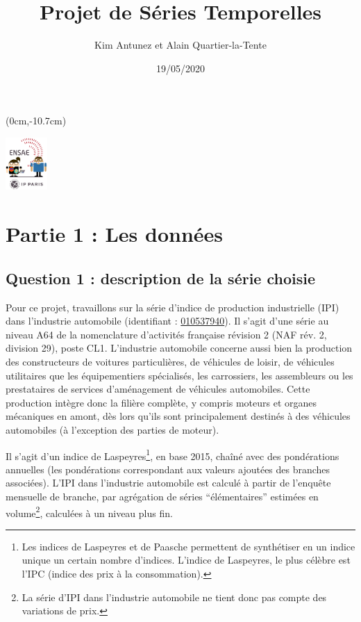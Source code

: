 \documentclass[french]{article}
\title{Projet de Séries Temporelles}
\author{Kim Antunez et Alain Quartier-la-Tente}
\date{19/05/2020}
\let\rmarkdownfootnote\footnote%
\def\footnote{\protect\rmarkdownfootnote}
\begin{document}
\maketitle

{
\hypersetup{linkcolor=}
\setcounter{tocdepth}{3}
\tableofcontents
}
\begin{textblock*}{\textwidth}(0cm,-10.7cm)
\begin{center}
\includegraphics[height=2cm]{img/LOGO-ENSAE-avatar.png}
\end{center}
\end{textblock*}

\thispagestyle{empty}
\newpage\setcounter{page}{1}

\hypertarget{partie-1-les-donnuxe9es}{%
\section{Partie 1 : Les données}\label{partie-1-les-donnuxe9es}}

\hypertarget{question-1-description-de-la-suxe9rie-choisie}{%
\subsection{Question 1 : description de la série choisie}\label{question-1-description-de-la-suxe9rie-choisie}}

Pour ce projet, travaillons sur la série d'indice de production industrielle (IPI) dans l'industrie automobile (identifiant : \href{https://bdm.insee.fr/series/sdmx/data/SERIES_BDM/010537940}{010537940}).
Il s'agit d'une série au niveau A64 de la nomenclature d'activités française révision 2 (NAF rév. 2, division 29), poste CL1.
L'industrie automobile concerne aussi bien la production des constructeurs de voitures particulières, de véhicules de loisir, de véhicules utilitaires que les équipementiers spécialisés, les carrossiers, les assembleurs ou les prestataires de services d'aménagement de véhicules automobiles.
Cette production intègre donc la filière complète, y compris moteurs et organes mécaniques en amont, dès lors qu'ils sont principalement destinés à des véhicules automobiles (à l'exception des parties de moteur).

Il s'agit d'un indice de Laspeyres\footnote{Les indices de Laspeyres et de Paasche permettent de synthétiser en un indice unique un certain nombre d'indices. L'indice de Laspeyres, le plus célèbre est l'IPC (indice des prix à la consommation).}, en base 2015, chaîné avec des pondérations annuelles (les pondérations correspondant aux valeurs ajoutées des branches associées).
L'IPI dans l'industrie automobile est calculé à partir de l'enquête mensuelle de branche, par agrégation de séries ``élémentaires'' estimées en volume\footnote{La série d'IPI dans l'industrie automobile ne tient donc pas compte des variations de prix.}, calculées à un niveau plus fin.
\end{document}
